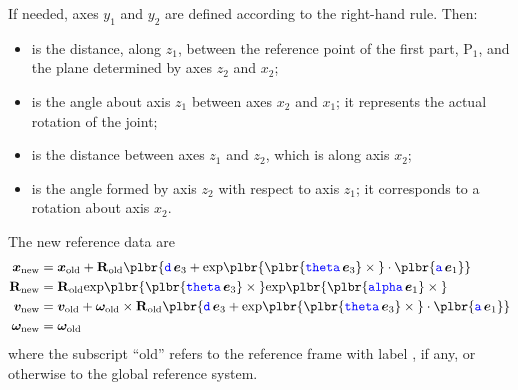 If needed, axes $y_1$ and $y_2$ are defined according to the right-hand rule.
Then:
\begin{itemize}
\item {} is the distance, along $z_1$, between the reference point of the first part, $\text{P}_1$, and the plane determined by axes $z_2$ and $x_2$;

\item {} is the angle about axis $z_1$ between axes $x_2$ and $x_1$; it represents the actual rotation of the joint;

\item {} is the distance between axes $z_1$ and $z_2$, which is along axis $x_2$;

\item {} is the angle formed by axis $z_2$ with respect to axis $z_1$; it corresponds to a rotation about axis $x_2$.
\end{itemize}

The new reference data are
\begin{subequations}
\begin{align}
	\T{x}_\text{new}
	&=
	\T{x}_\text{old}
	+
	\TT{R}_\text{old} \plbr{
		\nt{d} \, \T{e}_3
		+
		\text{exp}\plbr{\plbr{\nt{theta} \, \T{e}_3} \times{}} \cdot \plbr{\nt{a} \, \T{e}_1}
	}
	\\
	\TT{R}_\text{new}
	&=
	\TT{R}_\text{old} \text{exp}\plbr{\plbr{\nt{theta} \, \T{e}_3} \times{}} \text{exp}\plbr{\plbr{\nt{alpha} \, \T{e}_1} \times{}}
	\\
	\T{v}_\text{new}
	&=
	\T{v}_\text{old}
	+
	\T{\omega}_\text{old} \times \TT{R}_\text{old} \plbr{
		\nt{d} \, \T{e}_3
		+
		\text{exp}\plbr{\plbr{\nt{theta} \, \T{e}_3} \times{}} \cdot \plbr{\nt{a} \, \T{e}_1}
	}
	\\
	\T{\omega}_\text{new}
	&=
	\T{\omega}_\text{old}
\end{align}
\end{subequations}
where the subscript ``old'' refers to the reference frame with label , if any, or otherwise to the global reference system.

